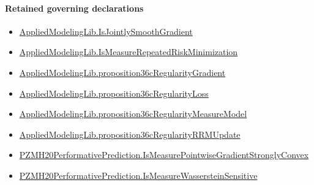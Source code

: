 \documentclass[10pt]{article}
\begin{document}
\paragraph{Retained governing declarations}
\begin{itemize}\raggedright
\item \hyperlink{library-prerequisite-2e05b739f5b71f23}{Applied\allowbreak{}Modeling\allowbreak{}Lib.\allowbreak{}Is\allowbreak{}Jointly\allowbreak{}Smooth\allowbreak{}Gradient}
\item \hyperlink{governing-declaration-916f213e8c73a94a}{Applied\allowbreak{}Modeling\allowbreak{}Lib.\allowbreak{}Is\allowbreak{}Measure\allowbreak{}Repeated\allowbreak{}Risk\allowbreak{}Minimization}
\item \hyperlink{governing-declaration-954407b64b7a9ac2}{Applied\allowbreak{}Modeling\allowbreak{}Lib.\allowbreak{}proposition36c\allowbreak{}Regularity\allowbreak{}Gradient}
\item \hyperlink{governing-declaration-9a6823e6fdefa446}{Applied\allowbreak{}Modeling\allowbreak{}Lib.\allowbreak{}proposition36c\allowbreak{}Regularity\allowbreak{}Loss}
\item \hyperlink{governing-declaration-9b198d5b04ab29c5}{Applied\allowbreak{}Modeling\allowbreak{}Lib.\allowbreak{}proposition36c\allowbreak{}Regularity\allowbreak{}Measure\allowbreak{}Model}
\item \hyperlink{governing-declaration-39c6c11ddc030996}{Applied\allowbreak{}Modeling\allowbreak{}Lib.\allowbreak{}proposition36c\allowbreak{}Regularity\allowbreak{}RRM\allowbreak{}Update}
\item \hyperlink{governing-declaration-11c9ab6e3c6f528b}{PZMH20\allowbreak{}Performative\allowbreak{}Prediction.\allowbreak{}Is\allowbreak{}Measure\allowbreak{}Pointwise\allowbreak{}Gradient\allowbreak{}Strongly\allowbreak{}Convex}
\item \hyperlink{paper-prerequisite-2ea2f5769822c5c4}{PZMH20\allowbreak{}Performative\allowbreak{}Prediction.\allowbreak{}Is\allowbreak{}Measure\allowbreak{}Wasserstein\allowbreak{}Sensitive}
\end{itemize}
\end{document}
